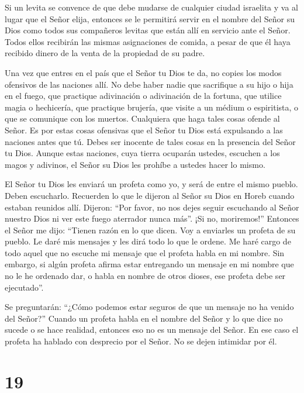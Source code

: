  Si un levita se convence de que debe mudarse de cualquier
ciudad israelita y va al lugar que el Señor elija,  entonces
se le permitirá servir en el nombre del Señor su Dios como todos sus
compañeros levitas que están allí en servicio ante el Señor.
 Todos ellos recibirán las mismas asignaciones de comida, a
pesar de que él haya recibido dinero de la venta de la propiedad de su
padre.

 Una vez que entres en el país que el Señor tu Dios te da,
no copies los modos ofensivos de las naciones allí.  No
debe haber nadie que sacrifique a su hijo o hija en el fuego, que
practique adivinación o adivinación de la fortuna, que utilice magia o
hechicería,  que practique brujería, que visite a un médium
o espiritista, o que se comunique con los muertos. Cualquiera que haga
tales cosas ofende al Señor.  Es por estas cosas ofensivas
que el Señor tu Dios está expulsando a las naciones antes que tú.
 Debes ser inocente de tales cosas en la presencia del
Señor tu Dios.  Aunque estas naciones, cuya tierra ocuparán
ustedes, escuchen a los magos y adivinos, el Señor su Dios les prohíbe a
ustedes hacer lo mismo.

 El Señor tu Dios les enviará un profeta como yo, y será de
entre el mismo pueblo. Deben escucharlo.  Recuerden lo que
le dijeron al Señor su Dios en Horeb cuando estaban reunidos allí.
Dijeron: ``Por favor, no nos dejes seguir escuchando al Señor nuestro
Dios ni ver este fuego aterrador nunca más''. ¡Si no, moriremos!''
 Entonces el Señor me dijo: ``Tienen razón en lo que dicen.
 Voy a enviarles un profeta de su pueblo. Le daré mis
mensajes y les dirá todo lo que le ordene.  Me haré cargo
de todo aquel que no escuche mi mensaje que el profeta habla en mi
nombre.  Sin embargo, si algún profeta afirma estar
entregando un mensaje en mi nombre que no le he ordenado dar, o habla en
nombre de otros dioses, ese profeta debe ser ejecutado''.

 Se preguntarán: ``¿Cómo podemos estar seguros de que un
mensaje no ha venido del Señor?''  Cuando un profeta habla
en el nombre del Señor y lo que dice no sucede o se hace realidad,
entonces eso no es un mensaje del Señor. En ese caso el profeta ha
hablado con desprecio por el Señor. No se dejen intimidar por él.

\hypertarget{section-18}{%
\section{19}\label{section-18}}

